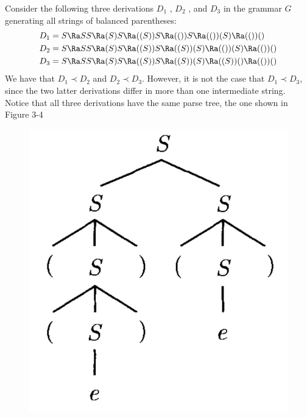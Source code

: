 \begin{example}{}
    Consider the following three derivations $D_1$ , $D_2$ , and $D_3$ in the grammar $G$ generating all strings of balanced parentheses:
    \begin{align*}
        D_1 &= S \Ra SS \Ra (S)S \Ra ((S))S \Ra (())S \Ra (())(S) \Ra (())()\\
        D_2 &= S \Ra SS \Ra (S)S \Ra ((S))S \Ra ((S))(S) \Ra (())(S) \Ra (())()\\
        D_3 &= S \Ra SS \Ra (S)S \Ra ((S))S \Ra ((S))(S) \Ra ((S))() \Ra (())()
    \end{align*}
    We have that $D_1 \prec D_2$ and $D_2 \prec D_3$. However, it is not the case that $D_1 \prec D_3$, since the two latter derivations differ in more than one intermediate string. Notice that all three derivations have the same parse tree, the one shown in Figure 3-4

    \begin{figure}[H]
        \centering
        \includegraphics[width=.2\textwidth]{img/fig3-4.png}
        \caption{}
    \end{figure}
\end{example}

